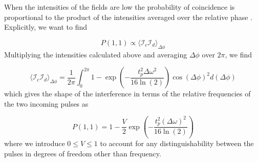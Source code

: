 When the intensities of the fields are low the probability of coincidence is proportional to the product of the intensities averaged over the relative phase \cite{Rarity2005}. Explicitly, we want to find

\begin{equation}
	P(1,1) \propto \langle \mathcal{I}_c \mathcal{I}_d\rangle_{\Delta\phi}
\end{equation}
Multiplying the intensities calculated above and averaging $\Delta\phi$ over $2\pi$, we find

\begin{equation}
	\langle \mathcal{I}_c \mathcal{I}_d\rangle_{\Delta\phi} = \frac{1}{2\pi}\int_0^{2\pi} 1 - \exp\left(-\frac{t_p^2 \Delta\omega^2}{16\ln(2)}\right)\cos(\Delta\phi)^2 d(\Delta\phi)
\end{equation} 
which gives the shape of the interference in terms of the relative frequencies of the two incoming pulses as

\begin{equation}
	P(1,1) = 1 - \frac{V}{2} \exp\left( -\frac{t_p^2(\Delta\omega)^2}{16\ln(2)} \right)
\end{equation}
where we introduce $0 \le V \le 1$ to account for any distinguishability between the pulses in degrees of freedom other than frequency. 

